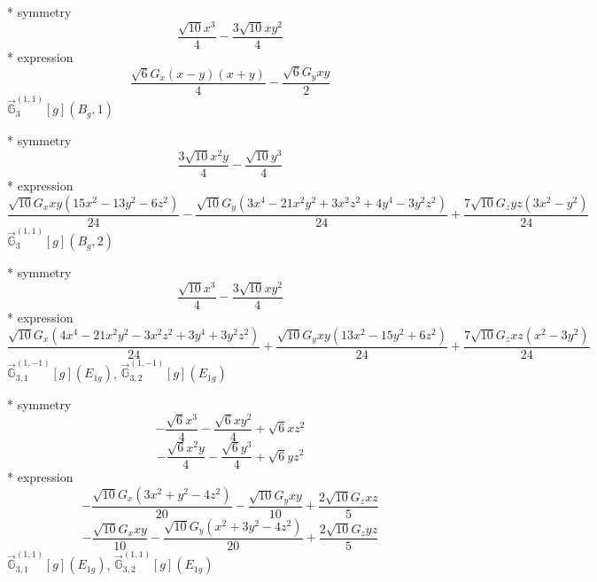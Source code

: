 \documentclass[fleqn,8pt]{jsarticle}
\begin{document}
\noindent\quad ** symmetry
\begin{dmath*}
\frac{\sqrt{10} x^{3}}{4} - \frac{3 \sqrt{10} x y^{2}}{4}
\end{dmath*}
\noindent\quad ** expression
\begin{dmath*}
\frac{\sqrt{6} G_{x} \left(x - y\right) \left(x + y\right)}{4} - \frac{\sqrt{6} G_{y} x y}{2}
\end{dmath*}
\noindent\quad $\vec{\mathbb{G}}_{3}^{(1,1)}[g](B_{g},1)$

\noindent\quad ** symmetry
\begin{dmath*}
\frac{3 \sqrt{10} x^{2} y}{4} - \frac{\sqrt{10} y^{3}}{4}
\end{dmath*}
\noindent\quad ** expression
\begin{dmath*}
\frac{\sqrt{10} G_{x} x y \left(15 x^{2} - 13 y^{2} - 6 z^{2}\right)}{24} - \frac{\sqrt{10} G_{y} \left(3 x^{4} - 21 x^{2} y^{2} + 3 x^{2} z^{2} + 4 y^{4} - 3 y^{2} z^{2}\right)}{24} + \frac{7 \sqrt{10} G_{z} y z \left(3 x^{2} - y^{2}\right)}{24}
\end{dmath*}
\noindent\quad $\vec{\mathbb{G}}_{3}^{(1,1)}[g](B_{g},2)$

\noindent\quad ** symmetry
\begin{dmath*}
\frac{\sqrt{10} x^{3}}{4} - \frac{3 \sqrt{10} x y^{2}}{4}
\end{dmath*}
\noindent\quad ** expression
\begin{dmath*}
\frac{\sqrt{10} G_{x} \left(4 x^{4} - 21 x^{2} y^{2} - 3 x^{2} z^{2} + 3 y^{4} + 3 y^{2} z^{2}\right)}{24} + \frac{\sqrt{10} G_{y} x y \left(13 x^{2} - 15 y^{2} + 6 z^{2}\right)}{24} + \frac{7 \sqrt{10} G_{z} x z \left(x^{2} - 3 y^{2}\right)}{24}
\end{dmath*}
\noindent\quad $\vec{\mathbb{G}}_{3,1}^{(1,-1)}[g](E_{1g})$, $\vec{\mathbb{G}}_{3,2}^{(1,-1)}[g](E_{1g})$

\noindent\quad ** symmetry
\begin{dmath*}
- \frac{\sqrt{6} x^{3}}{4} - \frac{\sqrt{6} x y^{2}}{4} + \sqrt{6} x z^{2}
\end{dmath*}
\begin{dmath*}
- \frac{\sqrt{6} x^{2} y}{4} - \frac{\sqrt{6} y^{3}}{4} + \sqrt{6} y z^{2}
\end{dmath*}
\noindent\quad ** expression
\begin{dmath*}
- \frac{\sqrt{10} G_{x} \left(3 x^{2} + y^{2} - 4 z^{2}\right)}{20} - \frac{\sqrt{10} G_{y} x y}{10} + \frac{2 \sqrt{10} G_{z} x z}{5}
\end{dmath*}
\begin{dmath*}
- \frac{\sqrt{10} G_{x} x y}{10} - \frac{\sqrt{10} G_{y} \left(x^{2} + 3 y^{2} - 4 z^{2}\right)}{20} + \frac{2 \sqrt{10} G_{z} y z}{5}
\end{dmath*}
\noindent\quad $\vec{\mathbb{G}}_{3,1}^{(1,1)}[g](E_{1g})$, $\vec{\mathbb{G}}_{3,2}^{(1,1)}[g](E_{1g})$
\end{document}
